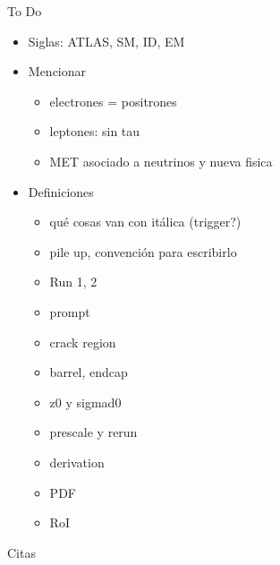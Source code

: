 
{\LARGE To Do}

\begin{itemize}
	\item Siglas: ATLAS, SM, ID, EM
	\item Mencionar
	\begin{itemize}
		\item electrones = positrones
		\item leptones: sin tau
		\item MET asociado a neutrinos y nueva fisica
	\end{itemize}
	\item Definiciones
	\begin{itemize}
		\item qué cosas van con itálica (trigger?)
		\item pile up, convención para escribirlo
		\item Run 1, 2
		\item prompt
		\item crack region
		\item barrel, endcap
		\item z0 y sigmad0
		\item prescale y rerun
		\item derivation
		\item PDF
		\item RoI
	\end{itemize}
\end{itemize}


\vspace{2cm}


{\LARGE Citas}

